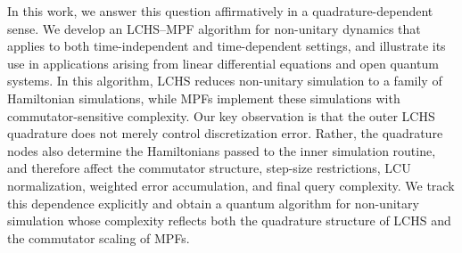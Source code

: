 \documentclass[10pt,reqno]{article}
\numberwithin{equation}{section}
\theoremstyle{plain}
\theoremstyle{definition}
\begin{document}
In this work, we answer this question affirmatively in a quadrature-dependent sense. We develop an LCHS--MPF algorithm for non-unitary dynamics that applies to both time-independent and time-dependent settings, and illustrate its use in applications arising from linear differential equations and open quantum systems. In this algorithm, LCHS reduces non-unitary simulation to a family of Hamiltonian simulations, while MPFs implement these simulations with commutator-sensitive complexity. Our key observation is that the outer LCHS quadrature does not merely control discretization error. Rather, the quadrature nodes also determine the Hamiltonians passed to the inner simulation routine, and therefore affect the commutator structure, step-size restrictions, LCU normalization, weighted error accumulation, and final query complexity. %
We track this dependence explicitly and obtain a quantum algorithm for non-unitary simulation whose complexity reflects both the quadrature structure of LCHS and the commutator scaling of MPFs.

\end{document}
